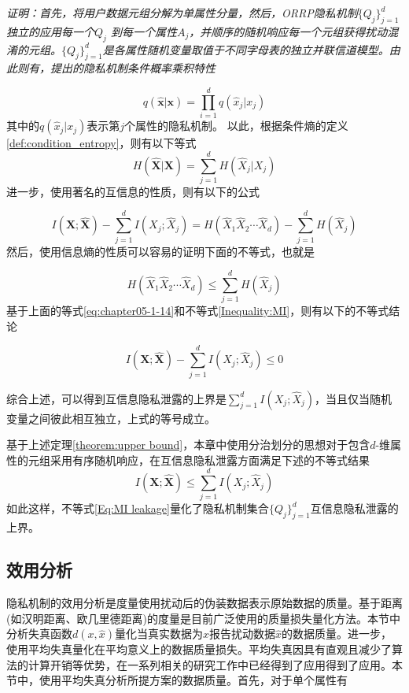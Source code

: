 {\em 证明：首先，将用户数据元组分解为单属性分量，然后，ORRP隐私机制$\{Q_j\}_{j=1}^d$独立的应用每一个$Q_j$ 到每一个属性$A_j$，并顺序的随机响应每一个元组获得扰动混淆的元组。$\{Q_j\}_{j=1}^d$是各属性随机变量取值于不同字母表的独立并联信道模型。由此则有，提出的隐私机制条件概率乘积特性
	
	\begin{equation}
		q(\bm{\hat{x}|x})=\prod_{i=1}^{d}q(\hat{x}_j|x_j)
	\end{equation}
	其中的$q(\hat{x}_j|x_j)$表示第$j$个属性的隐私机制。 以此，根据条件熵的定义\textup{\ref{def:condition_entropy}}，则有以下等式
	\begin{equation}
		H(\bm{\hat{X}|X})=\sum_{j=1}^{d}H(\hat{X}_j|X_j)
	\end{equation}
进一步，使用著名的互信息的性质，则有以下的公式
	
	\begin{equation}\label{eq:chapter05-1-14}
		I(\bm{X;\hat{X}})-\sum_{j=1}^{d}I(X_j;\hat{X}_j)=H(\hat{X}_1\hat{X}_2\cdots\hat{X}_d)-\sum_{j=1}^{d}H(\hat{X}_j)
	\end{equation}
然后，使用信息熵的性质可以容易的证明下面的不等式，也就是
	
	\begin{equation} \label{Inequality:MI}
		H(\hat{X}_1\hat{X}_2\cdots\hat{X}_d)\leq \sum_{j=1}^{d}H(\hat{X}_j)
	\end{equation}
基于上面的等式\textup{\ref{eq:chapter05-1-14}}和不等式\textup{\ref{Inequality:MI}}，则有以下的不等式结论
	
	\begin{equation}
		I(\bm{X;\hat{X}})-\sum_{j=1}^{d}I(X_j;\hat{X}_j)\leq 0
	\end{equation}

	综合上述，可以得到互信息隐私泄露的上界是$\sum_{j=1}^{d}I(X_j;\hat{X}_j)$，当且仅当随机变量之间彼此相互独立，上式的等号成立。
}

基于上述定理\ref{theorem:upper bound}，本章中使用分治划分的思想对于包含$d$-维属性的元组采用有序随机响应，在互信息隐私泄露方面满足下述的不等式结果
\begin{equation}\label{Eq:MI leakage}
	I(\bm{X};\bm{\hat{X}})\leq \sum_{j=1}^{d}I(X_j;\hat{X}_j)
\end{equation}
如此这样，不等式\ref{Eq:MI leakage}量化了隐私机制集合$\{Q_j\}_{j=1}^{d}$互信息隐私泄露的上界。

\subsection{效用分析}\label{subsec:utility_evalution}
隐私机制的效用分析是度量使用扰动后的伪装数据表示原始数据的质量。基于距离(如汉明距离\cite{kalantari2018robust,wang2016on}、欧几里德距离\cite{oya2017back})的度量是目前广泛使用的质量损失量化方法。本节中分析失真函数$d(x,\hat{x})$量化当真实数据为$x$报告扰动数据$\hat{x}$的数据质量。进一步，使用平均失真量化在平均意义上的数据质量损失。平均失真因具有直观且减少了算法的计算开销\cite{oya2017back}等优势，在一系列相关的研究工作中已经得到了应用得到了应用\cite{calmon2012privacy,andres2013geo,xiong2016randomized,oya2017back,wang2016on}。本节中，使用平均失真分析所提方案的数据质量。首先，对于单个属性有

